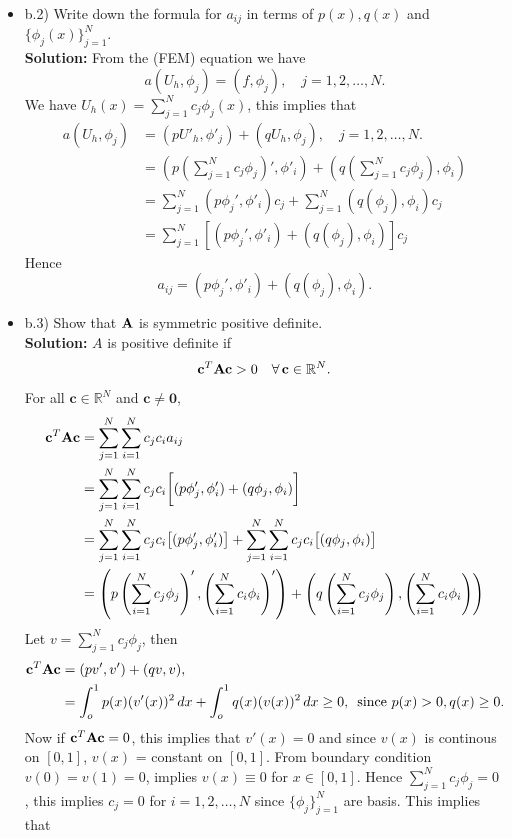 \documentclass[11pt]{article}      %
\begin{document}
\begin{enumerate}
\begin{enumerate}
\begin{itemize}
%
\item[]b.2) Write down the formula for $a_{ij}$ in terms of $p(x), q(x)$ and $\{\phi_j(x)\}_{j=1}^N$.\\

{\bf Solution:} From the (FEM) equation we have
$$a(U_h,\phi_j) = (f,\phi_j), \quad j = 1,2,\ldots,N.$$ We have $U_h(x) = \sum_{j=1}^{N}c_j\phi_j(x)$, this implies that
\begin{align*}
	a(U_h,\phi_j) &= (pU'_h,\phi'_j) + (qU_h,\phi_j) , \quad j = 1,2,\ldots,N.\\
	&=(p(\sum_{j=1}^{N}c_j\phi_j)',\phi'_i) + (q(\sum_{j=1}^{N}c_j\phi_j),\phi_i)\\
	&=\sum_{j=1}^{N}(p\phi_j',\phi'_i)c_j + \sum_{j=1}^{N}(q(\phi_j),\phi_i)c_j\\
	&=\sum_{j=1}^{N}[(p\phi_j',\phi'_i) + (q(\phi_j),\phi_i)]c_j
\end{align*}
Hence 
$$a_{ij} = (p\phi_j',\phi'_i) + (q(\phi_j),\phi_i).$$
%
\item[]b.3) Show that ${\bf A}$ is symmetric positive definite. \\
{\bf Solution:}
$A$ is positive definite if $$\mathbf{c}^T{\bf A}\mathbf{c} >0 \quad \forall\, \mathbf{c}\in\mathbb{R}^N.$$
For all $\mathbf{c} \in\mathbb{R}^N$ and $\mathbf{c} \neq\mathbf{0}$,
\begin{align*}
	\mathbf{c}^T {\bf A} {\bf c} &= \sum_{j=1}^{N}\sum_{i=1}^{N}c_jc_ia_{ij}\\
	&=\sum_{j=1}^{N}\sum_{i=1}^{N}c_jc_i\bigg[(p\phi'_j,\phi'_i) + (q\phi_j,\phi_i)\bigg]\\
	&=\sum_{j=1}^{N}\sum_{i=1}^{N}c_jc_i\big[(p\phi'_j,\phi'_i)\big]  + \sum_{j=1}^{N}\sum_{i=1}^{N}c_jc_i \big[(q\phi_j,\phi_i)\big]\\
	&=\left(p\left(\sum_{i=1}^{N}c_j\phi_j\right)',\left(\sum_{i=1}^{N}c_i\phi_i\right)'\right) + \left(q\left(\sum_{i=1}^{N}c_j\phi_j\right),\left(\sum_{i=1}^{N}c_i\phi_i\right)\right)
\end{align*}
Let $v = \sum_{j=1}^{N}c_j\phi_j$, then 
\begin{align*}
\mathbf{c}^T {\bf A} {\bf c} &=(pv',v') + (qv,v), \\
&= \int_{o}^{1}p(x)(v'(x))^2\, dx + \int_{o}^{1}q(x)(v(x))^2\, dx \geq 0, \,\text{ since } p(x)> 0, q(x) \geq 0.
\end{align*}
Now if ${\bf c}^T {\bf Ac} = 0$, this implies that $v'(x) = 0$ and since $v(x)$ is continous on $[0,1]$, $v(x)$ = constant on $[0,1]$. From boundary condition $v(0) = v(1) = 0$, implies $v(x)\equiv 0$ for $x\in[0,1]$. Hence $\sum_{j=1}^{N}c_j\phi_j =0$ , this implies $c_j = 0$ for $i = 1,2,\ldots,N$ since $\{\phi_j\}_{j=1}^N$ are basis. This implies that 

\end{itemize}
\end{enumerate}
\end{enumerate}
\end{document}
